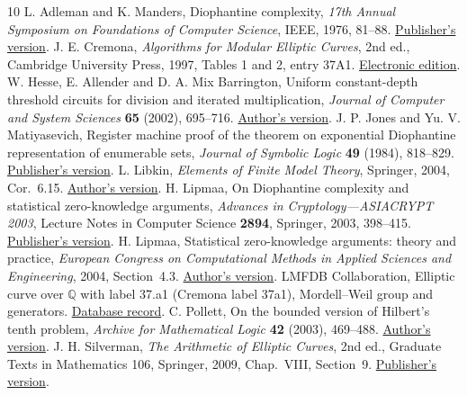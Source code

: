 \documentclass[11pt,letterpaper]{article}
\numberwithin{equation}{section}
\begin{document}
\begingroup
\small
\clearpage
\begin{thebibliography}{10}
\setlength{\itemsep}{2pt}
 L. Adleman and K. Manders, Diophantine complexity, \emph{17th Annual Symposium on Foundations of Computer Science}, IEEE, 1976, 81--88. \href{https://doi.org/10.1109/SFCS.1976.13}{Publisher's version}.
 J. E. Cremona, \emph{Algorithms for Modular Elliptic Curves}, 2nd ed., Cambridge University Press, 1997, Tables 1 and 2, entry 37A1. \href{https://wstein.org/edu/Fall2003/252/references/cremona-algs/Cremona-Algorithms_for_modular_elliptic_curves.pdf}{Electronic edition}.
 W. Hesse, E. Allender and D. A. Mix Barrington, Uniform constant-depth threshold circuits for division and iterated multiplication, \emph{Journal of Computer and System Sciences} \textbf{65} (2002), 695--716. \href{https://people.cs.rutgers.edu/~allender/papers/division.pdf}{Author's version}.
 J. P. Jones and Yu. V. Matiyasevich, Register machine proof of the theorem on exponential Diophantine representation of enumerable sets, \emph{Journal of Symbolic Logic} \textbf{49} (1984), 818--829. \href{https://www.cambridge.org/core/journals/journal-of-symbolic-logic/article/abs/register-machine-proof-of-the-theorem-on-exponential-diophantine-representation-of-enumerable-sets/A2A8808B208B10A9D71BF54B6E7DA10E}{Publisher's version}.
 L. Libkin, \emph{Elements of Finite Model Theory}, Springer, 2004, Cor.~6.15. \href{https://www.cs.toronto.edu/~libkin/fmt/fmt.pdf}{Author's version}.
 H. Lipmaa, On Diophantine complexity and statistical zero-knowledge arguments, \emph{Advances in Cryptology---ASIACRYPT 2003}, Lecture Notes in Computer Science \textbf{2894}, Springer, 2003, 398--415. \href{https://doi.org/10.1007/978-3-540-40061-5_26}{Publisher's version}.
 H. Lipmaa, Statistical zero-knowledge arguments: theory and practice, \emph{European Congress on Computational Methods in Applied Sciences and Engineering}, 2004, Section~4.3. \href{https://kodu.ut.ee/~lipmaa/papers/lip04/eccomas.pdf}{Author's version}.
 LMFDB Collaboration, Elliptic curve over $\mathbb Q$ with label 37.a1 (Cremona label 37a1), Mordell--Weil group and generators. \href{https://www.lmfdb.org/EllipticCurve/Q/37/a/1}{Database record}.
 C. Pollett, On the bounded version of Hilbert's tenth problem, \emph{Archive for Mathematical Logic} \textbf{42} (2003), 469--488. \href{https://www.cs.sjsu.edu/faculty/pollett/papers/hilbert10.pdf}{Author's version}.
 J. H. Silverman, \emph{The Arithmetic of Elliptic Curves}, 2nd ed., Graduate Texts in Mathematics 106, Springer, 2009, Chap.~VIII, Section~9. \href{https://doi.org/10.1007/978-0-387-09494-6}{Publisher's version}.
\end{thebibliography}
\endgroup
\end{document}
